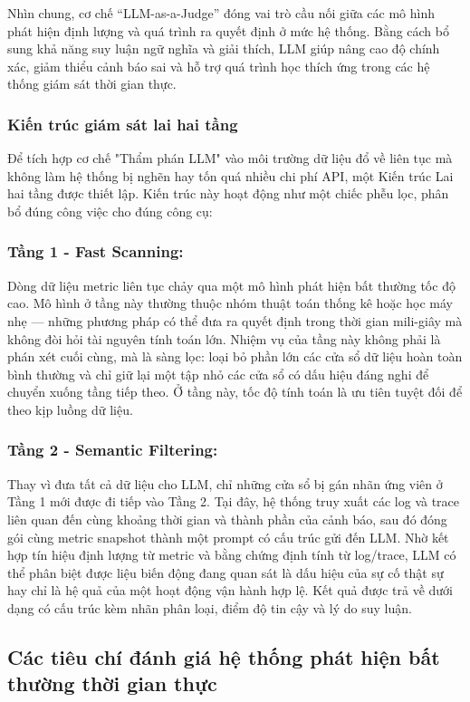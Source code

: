 Nhìn chung, cơ chế “LLM-as-a-Judge” đóng vai trò cầu nối giữa các mô hình phát hiện định lượng và quá trình ra quyết định ở mức hệ thống. Bằng cách bổ sung khả năng suy luận ngữ nghĩa và giải thích, LLM giúp nâng cao độ chính xác, giảm thiểu cảnh báo sai và hỗ trợ quá trình học thích ứng trong các hệ thống giám sát thời gian thực.

\subsubsection{Kiến trúc giám sát lai hai tầng}
Để tích hợp cơ chế "Thẩm phán LLM" vào môi trường dữ liệu đổ về liên tục mà không làm hệ thống bị nghẽn hay tốn quá nhiều chi phí API, một Kiến trúc Lai hai tầng được thiết lập. Kiến trúc này hoạt động như một chiếc phễu lọc, phân bổ đúng công việc cho đúng công cụ:

\subsubsection*{Tầng 1 - Fast Scanning:}
Dòng dữ liệu metric liên tục chảy qua một mô hình phát hiện bất thường 
tốc độ cao. Mô hình ở tầng này thường thuộc nhóm thuật toán thống kê 
hoặc học máy nhẹ — những phương pháp có thể đưa ra quyết định trong 
thời gian mili-giây mà không đòi hỏi tài nguyên tính toán lớn. Nhiệm vụ 
của tầng này không phải là phán xét cuối cùng, mà là sàng lọc: loại bỏ 
phần lớn các cửa sổ dữ liệu hoàn toàn bình thường và chỉ giữ lại một tập 
nhỏ các cửa sổ có dấu hiệu đáng nghi để chuyển xuống tầng tiếp theo. 
Ở tầng này, tốc độ tính toán là ưu tiên tuyệt đối để theo kịp luồng dữ liệu.

\subsubsection*{Tầng 2 - Semantic Filtering:}
Thay vì đưa tất cả dữ liệu cho LLM, chỉ những cửa sổ bị gán nhãn ứng 
viên ở Tầng 1 mới được đi tiếp vào Tầng 2. Tại đây, hệ thống truy xuất 
các log và trace liên quan đến cùng khoảng thời gian và thành phần của 
cảnh báo, sau đó đóng gói cùng metric snapshot thành một prompt có cấu 
trúc gửi đến LLM. Nhờ kết hợp tín hiệu định lượng từ metric và bằng 
chứng định tính từ log/trace, LLM có thể phân biệt được liệu biến động 
đang quan sát là dấu hiệu của sự cố thật sự hay chỉ là hệ quả của một 
hoạt động vận hành hợp lệ. Kết quả được trả về dưới dạng có cấu trúc 
kèm nhãn phân loại, điểm độ tin cậy và lý do suy luận.

\subsection{Các tiêu chí đánh giá hệ thống phát hiện bất thường thời gian thực}

